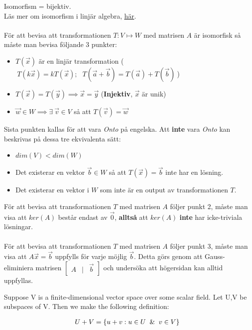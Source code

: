\documentclass{report}
\begin{document}
{
	Isomorfism = bijektiv.\\
	Läs mer om isomorfism i linjär algebra, \href{https://math.libretexts.org/Bookshelves/Linear_Algebra/A_First_Course_in_Linear_Algebra_(Kuttler)/05\%3A_Linear_Transformations/5.06\%3A_Isomorphisms}{här}.
	\\\\
	
	För att bevisa att transformationen $T: V \mapsto W$ med matrisen $A$ är isomorfisk så måste man bevisa följande 3 punkter:
	\begin{itemize}
		\item $T(\vec{x})$ är en linjär transformation ($\:T(k\vec{x}) = kT(\vec{x}); \:\:\: T(\vec{a} + \vec{b}) = T(\vec{a}) + T(\vec{b})\:$)
		\item $T(\vec{x}) = T(\vec{y}) \implies \vec{x} = \vec{y}$ (\textbf{Injektiv}, $\vec{x}$ är unik)
		\item $\vec{w} \in W \implies \exists \: \vec{v} \in V$ så att $T(\vec{v}) = \vec{w}$
	\end{itemize}
	Sista punkten kallas för att vara \textit{Onto} på engelska. Att \textbf{inte} vara \textit{Onto} kan beskrivas på dessa tre ekvivalenta sätt:
	\begin{itemize}
		\item $dim(V) < dim(W)$
		\item Det existerar en vektor $\vec{b} \in W$ så att $T(\vec{x}) = \vec{b}$ inte har en lösning.
		\item Det existerar en vektor i $W$ som inte är en output av transformationen $T$. 
	\end{itemize}
	För att bevisa att transformationen $T$ med matrisen $A$ följer punkt 2, måste man visa att $ker(A)$ består endast av $\vec{0}$, \textbf{alltså} att $ker(A)$ \textbf{inte} har icke-triviala lösningar.\\\\
	
	För att bevisa att transformationen $T$ med matrisen $A$ följer punkt 3, måste man visa att $A\vec{x} = \vec{b}$ uppfylls för varje möjlig $\vec{b}$. Detta görs genom att Gauss-eliminiera matrisen $
\begin{bmatrix}
	A & | & \vec{b}
\end{bmatrix}	
$ och undersöka att högersidan kan alltid uppfyllas. 
}

{
	Suppose V is a finite-dimensional vector space over some scalar field. 
	Let U,V be subspaces of V. Then we make the following definition:

\begin{align*}
	U + V = \{u+v : u \in U \And v \in V \} 
\end{align*}
}
\end{document}
